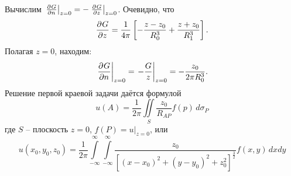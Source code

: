 Вычислим $\left. \frac{\partial^{}G}{\partial n^{}}\right|_{z = 0} = - \left. \frac{\partial^{}G}{\partial z^{}}\right|_{z = 0}$. Очевидно, что
\[
	\frac{\partial^{}G}{\partial z^{}} = \frac{1}{4 \pi} \left[ - \frac{z - z_0}{R_0^3} + \frac{z + z_0}{R_1^3} \right].
\]
Полагая $z = 0$, находим:
\[
	\left. \frac{\partial^{}G}{\partial n^{}} \right|_{z = 0} = \left. - \frac{G}{z}\right|_{z = 0} = - \frac{z_0}{2 \pi R_0^3}.
\]
Решение первой краевой задачи даётся формулой 
\[	
	u(A) = \frac{1}{2 \pi} \iint\limits_S \frac{z_0}{R_{AP} }f(p)\, d\sigma_P
\]
где $S$ -- плоскость $z = 0$, $f(P) = u|_{z = 0}$, или
\[
	u(x_0, y_0, z_0) = \frac{1}{2 \pi} \int\limits_{-\infty}^{\infty} \int\limits_{- \infty}^{\infty} \frac{z_0}{\left[(x - x_0)^2 + (y - y_0)^2 + z_0^2 \right]^{\frac{3}{2}}} f(x, y)\, dx dy
\]
	

